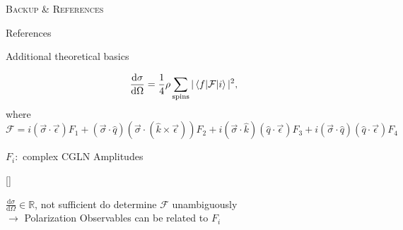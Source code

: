 \documentclass[11pt,aspectratio=169,dvipsnames]{beamer}
\newcommand{\thecolor}{black!70!blue}
\begin{document}
\appendix
\begin{frame}
	\centering
	\LARGE
	\color{\thecolor}\textsc{Backup \& References}
\end{frame}
\begin{frame}[allowframebreaks]{References}
	    \printbibliography
	
\end{frame}
\begin{frame}{Additional theoretical basics}
	\begin{tcolorbox}[colback=blue!5,colframe=\thecolor,title=Unpolarized differential cross section]
		
		$$\frac{\text{d}\sigma}{\text{d}\Omega}=\frac{1}{4}\rho\sum_{\text{spins}}|\braket{f|\mathcal{F}|i}|^2\\,$$
		where
		$$\mathcal{F}=i(\vec{\sigma}\cdot\vec{\epsilon})F_1+(\vec{\sigma}\cdot\hat{q})(\vec{\sigma}\cdot(\hat{k}\times\vec{\epsilon}))F_2+i(\vec{\sigma}\cdot\hat{k})(\hat{q}\cdot\vec{\epsilon})F_3+i(\vec{\sigma}\cdot\hat{q})(\hat{q}\cdot\vec{\epsilon})F_4$$
		\begin{flushright}
			$F_i:$ complex CGLN Amplitudes
		\end{flushright}
		
		
		\begin{flushright}
			{\scriptsize[\cite{cgln}]}
		\end{flushright}
	\end{tcolorbox}
	$\frac{\text{d}\sigma}{\text{d}\Omega}\in\mathbb{R}$, not sufficient do determine $\mathcal{F}$ unambiguously\\
	$\rightarrow$ Polarization Observables can be related to $F_i$
\end{frame}
\end{document}
